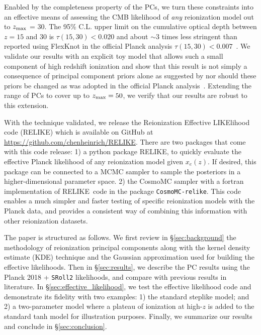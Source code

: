 \documentclass[prd,twocolumn,amsmath,amssymb,floatfix,superscriptaddress,nofootinbib]{revtex4-1}
\newcommand{\zmax}{z_{\rm max}}
\newcommand{\relike}{RELIKE}%
\newcommand{\cosmomcrelike}{\texttt{CosmoMC-relike}}
\begin{document}
Enabled by the completeness property of the PCs, we turn these constraints into an effective means of  assessing the CMB likelihood of \textit{any} reionization model out to $\zmax$ = 30. 
The 95\% C.L. upper limit on the cumulative optical depth between $z=15$ and 30 is $\tau(15, 30) < 0.020$  and about $\sim3$ times less stringent than reported using FlexKnot in the official Planck analysis $\tau(15, 30)<0.007$~\cite{Aghanim:2018eyx}.  We validate our results with an explicit toy model that allows such a small component of high redshift ionization and show that this result is not simply a consequence of principal component priors alone as suggested by \cite{Millea:2018bko} nor should these priors be changed as was adopted in the official Planck analysis~\cite{Aghanim:2018eyx}.
Extending the range of PCs to cover up to $z_{\rm max} = 50$, we verify that our results are robust to this extension.

With the technique  validated,
we release the Reionization Effective LIKElihood code (\relike) which is available on GitHub at \url{https://github.com/chenheinrich/RELIKE}. There are two packages that come with this code release: 1)  a python package \relike, to quickly evaluate the effective Planck likelihood of any reionization model given $x_e(z)$. If desired, this package can be connected to a MCMC sampler to sample the posteriors in a higher-dimensional parameter space. 2)  the CosmoMC sampler with a fortran implementation of \relike\  code in the package \cosmomcrelike. This code enables a  much simpler and faster testing of specific reionization models with the Planck data, and provides a  consistent way of combining this information with other reionization datasets. 

The paper is structured as follows. We first review in \S\ref{sec:background} the methodology of  reionization principal components along with the kernel density estimate (KDE) technique and the Gaussian approximation \cite{Heinrich:2016ojb} used for building the effective likelihoods. Then in \S\ref{sec:results}, we describe the PC results using the Planck 2018 + \texttt{SRoll2} likelihoods, and compare with previous results in literature. In \S\ref{sec:effective_likelihood}, we test the effective likelihood code and demonstrate its fidelity with two examples: 1) the standard steplike model; and 2) a two-parameter model where a plateau of ionization at high-$z$ is added to the standard tanh model for illustration purposes. Finally, we summarize our results and conclude in \S\ref{sec:conclusion}.
\end{document}
